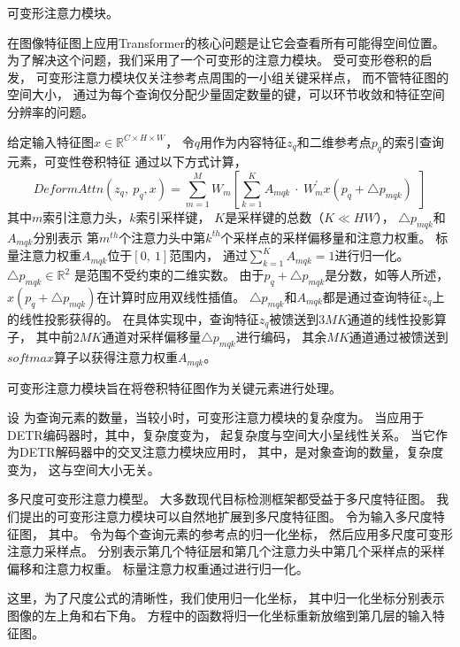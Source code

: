 可变形注意力模块。

在图像特征图上应用Transformer的核心问题是让它会查看所有可能得空间位置。
为了解决这个问题，我们采用了一个可变形的注意力模块。
受可变形卷积的启发，
可变形注意力模块仅关注参考点周围的一小组关键采样点，
而不管特征图的空间大小，
通过为每个查询仅分配少量固定数量的键，可以环节收敛和特征空间分辨率的问题。


给定输入特征图$x \in \mathbb{R}^{C\times H \times W}$，
令$q$用作为内容特征$z_{q}$和二维参考点$p_{q}$的索引查询元素，可变性卷积特征
通过以下方式计算，
% 
% 
% 
% 
\begin{equation}
DeformAttn(z_{q},~p_{q},x)=
\sum_{m=1}^{M}
W_{m}\left [ 
\sum_{k=1}^{K}A_{mqk}~\cdot~
 W_{m}^{'}x\left ( p_{q} + \bigtriangleup p_{mqk} \right ) 
~~\right ]  
\end{equation}
% 
% 
% 
% 
其中$m$索引注意力头，$k$索引采样键，
$K$是采样键的总数（$K \ll HW$），
$\bigtriangleup p_{mqk} $和$A_{mqk}$分别表示
第$m^{th}$个注意力头中第$k^{th}$个采样点的采样偏移量和注意力权重。
标量注意力权重$A_{mqk}$位于$\left [ 0,~1 \right ] $范围内，
通过$ {\textstyle \sum_{k=1}^{K}} A_{mqk}=1$进行归一化。
$\bigtriangleup p_{mqk} \in \mathbb{R}^{2}$
是范围不受约束的二维实数。
由于$p_{q} + \bigtriangleup p_{mqk}$是分数，如等人所述，
$x\left ( p_{q} + \bigtriangleup p_{mqk} \right ) $在计算时应用双线性插值。
$\bigtriangleup p_{mqk}   $和$A_{mqk}$都是通过查询特征$z_{q}$上的线性投影获得的。
在具体实现中，查询特征$z_{q}$被馈送到$3MK$通道的线性投影算子，
其中前$2MK$通道对采样偏移量$\bigtriangleup p_{mqk}$进行编码，
其余$MK$通道通过被馈送到$softmax$算子以获得注意力权重$A_{mqk}$。





可变形注意力模块旨在将卷积特征图作为关键元素进行处理。

设 为查询元素的数量，当较小时，可变形注意力模块的复杂度为。
当应用于DETR编码器时，其中，复杂度变为，
起复杂度与空间大小呈线性关系。
当它作为DETR解码器中的交叉注意力模块应用时，
其中，是对象查询的数量，复杂度变为，
这与空间大小无关。


多尺度可变形注意力模型。
大多数现代目标检测框架都受益于多尺度特征图。
我们提出的可变形注意力模块可以自然地扩展到多尺度特征图。
令为输入多尺度特征图，
其中。
令为每个查询元素的参考点的归一化坐标，
然后应用多尺度可变形注意力采样点。
分别表示第几个特征层和第几个注意力头中第几个采样点的采样偏移和注意力权重。
标量注意力权重通过进行归一化。

这里，为了尺度公式的清晰性，我们使用归一化坐标，
其中归一化坐标分别表示图像的左上角和右下角。
方程中的函数将归一化坐标重新放缩到第几层的输入特征图。


